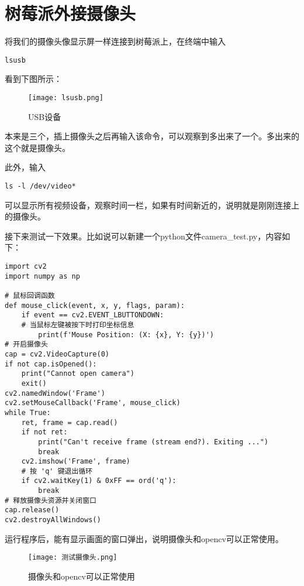 \section{树莓派外接摄像头}
将我们的摄像头像显示屏一样连接到树莓派上，在终端中输入
\begin{lstlisting}[style=bashstyle]
	lsusb
\end{lstlisting}
看到下图所示：
\begin{figure}[H]
	\centering
	\texttt{[image: lsusb.png]}
	\caption{USB设备}
	\label{fig:example}
\end{figure}
本来是三个，插上摄像头之后再输入该命令，可以观察到多出来了一个。多出来的这个就是摄像头。
\par
此外，输入
\begin{lstlisting}[style=bashstyle]
	ls -l /dev/video*
\end{lstlisting}
可以显示所有视频设备，观察时间一栏，如果有时间新近的，说明就是刚刚连接上的摄像头。
\par
接下来测试一下效果。比如说可以新建一个python文件camera\_test.py，内容如下：
\begin{lstlisting}[style=pythonstyle]
import cv2
import numpy as np

# 鼠标回调函数
def mouse_click(event, x, y, flags, param):
	if event == cv2.EVENT_LBUTTONDOWN:
	# 当鼠标左键被按下时打印坐标信息
		print(f'Mouse Position: (X: {x}, Y: {y})')
# 开启摄像头
cap = cv2.VideoCapture(0)
if not cap.isOpened():
	print("Cannot open camera")
	exit()
cv2.namedWindow('Frame')
cv2.setMouseCallback('Frame', mouse_click)
while True:
	ret, frame = cap.read()
	if not ret:
		print("Can't receive frame (stream end?). Exiting ...")
		break	
	cv2.imshow('Frame', frame)
	# 按 'q' 键退出循环
	if cv2.waitKey(1) & 0xFF == ord('q'):
		break
# 释放摄像头资源并关闭窗口
cap.release()
cv2.destroyAllWindows()
\end{lstlisting}
\par
运行程序后，能有显示画面的窗口弹出，说明摄像头和opencv可以正常使用。
\begin{figure}[H]
	\centering
	\texttt{[image: 测试摄像头.png]}
	\caption{摄像头和opencv可以正常使用}
	\label{fig:example}
\end{figure}

